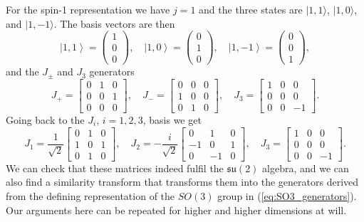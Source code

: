\documentclass[notes.tex]{subfiles}
\begin{document}
For the spin-1 representation we have $j=1$ and the three states are $|1,1\rangle$, $|1,0\rangle$, and $|1,-1\rangle$. The basis vectors are then
\[ \left|1,1\right>=\left(\begin{matrix} 1 \\ 0 \\ 0 \end{matrix}\right), \quad \left|1,0\right>=\left(\begin{matrix} 0 \\ 1 \\ 0 \end{matrix}\right),\quad \left|1,-1\right>=\left(\begin{matrix} 0 \\ 0 \\ 1 \end{matrix}\right), \]
and the $J_\pm$ and $J_3$ generators
\[ J_+=\left[\begin{matrix} 0 & 1  & 0 \\ 0 & 0 & 1 \\  0 & 0 & 0 \end{matrix}\right], \quad 
J_-=\left[\begin{matrix} 0 & 0  & 0 \\ 1 & 0 & 0 \\  0 & 1 & 0 \end{matrix}\right],  \quad 
J_3= \left[\begin{matrix} 1 & 0 & 0 \\ 0 & 0 & 0\\  0 & 0 & -1 \end{matrix}\right]. \]
Going back to the $J_i$, $i=1,2,3$, basis we get
\[ J_1=\frac{1}{\sqrt{2}}\left[\begin{matrix} 0 & 1  & 0 \\ 1 & 0 & 1 \\  0 & 1 & 0 \end{matrix}\right], \quad 
J_2=- \frac{i}{\sqrt{2}}\left[\begin{matrix} 0 & 1  & 0 \\ -1 & 0 & 1 \\  0 & -1 & 0 \end{matrix}\right],  \quad 
J_3= \left[\begin{matrix} 1 & 0 & 0 \\ 0 & 0 & 0\\  0 & 0 & -1 \end{matrix}\right]. \]
We can check that these matrices indeed fulfil the $\mathfrak{su}(2)$ algebra, and we can also find a similarity transform that transforms them into the generators derived from the defining representation of the $SO(3)$ group in (\ref{eq:SO3_generators}).
Our arguments here can be repeated for higher and higher dimensions at will.
\end{document}
